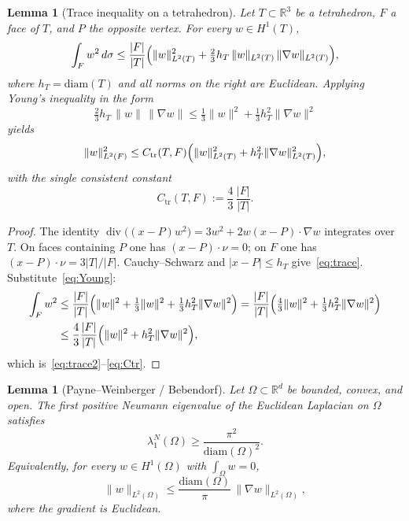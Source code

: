 \documentclass[11pt]{amsart}
\newtheorem{lemma}[theorem]{Lemma}
\theoremstyle{definition}
\newcommand{\RR}{\mathbb{R}}
\newcommand{\diam}{\mathrm{diam}}
\newcommand{\abs}[1]{\lvert#1\rvert}
\newcommand{\norm}[1]{\lVert#1\rVert}
\begin{document}
\begin{lemma}[Trace inequality on a tetrahedron]
\label{lem:T}
Let $T\subset\RR^3$ be a tetrahedron, $F$ a face of $T$, and $P$ the
opposite vertex.  For every $w\in H^1(T)$,
\begin{equation}
\label{eq:trace}
  \int_F w^2\,d\sigma
  \le
  \frac{\abs{F}}{\abs{T}}
  \Bigl(
    \norm{w}_{L^2(T)}^2
    +
    \tfrac23 h_T\,\norm{w}_{L^2(T)}\,\norm{\nabla w}_{L^2(T)}
  \Bigr),
\end{equation}
where $h_T=\diam(T)$ and all norms on the right are Euclidean.  Applying
Young's inequality in the form
\begin{equation}
\label{eq:Young}
  \tfrac23 h_T\,\norm{w}\,\norm{\nabla w}
  \le
  \tfrac13\norm{w}^2
  +
  \tfrac13 h_T^2\norm{\nabla w}^2
\end{equation}
yields
\begin{equation}
\label{eq:trace2}
  \norm{w}_{L^2(F)}^2
  \le
  C_{\mathrm{tr}}(T,F)
  \Bigl(
    \norm{w}_{L^2(T)}^2
    +
    h_T^2\norm{\nabla w}_{L^2(T)}^2
  \Bigr),
\end{equation}
with the single consistent constant
\begin{equation}
\label{eq:Ctr}
  C_{\mathrm{tr}}(T,F)
  :=
  \frac43\,\frac{\abs{F}}{\abs{T}}.
\end{equation}
\end{lemma}

\begin{proof}
The identity
$\operatorname{div}\bigl((x-P)w^2\bigr)=3w^2+2w(x-P)\cdot\nabla w$
integrates over $T$.  On faces containing $P$ one has $(x-P)\cdot\nu=0$;
on $F$ one has $(x-P)\cdot\nu=3\abs{T}/\abs{F}$.  Cauchy--Schwarz and
$\abs{x-P}\le h_T$ give~\eqref{eq:trace}.  Substitute~\eqref{eq:Young}:
\begin{align*}
  \int_F w^2
  &\le
  \frac{\abs{F}}{\abs{T}}
  \Bigl(
    \norm{w}^2
    +
    \tfrac13\norm{w}^2
    +
    \tfrac13 h_T^2\norm{\nabla w}^2
  \Bigr)
  =
  \frac{\abs{F}}{\abs{T}}
  \Bigl(
    \tfrac43\norm{w}^2
    +
    \tfrac13 h_T^2\norm{\nabla w}^2
  \Bigr)\\
  &\le
  \frac43\frac{\abs{F}}{\abs{T}}
  \Bigl(
    \norm{w}^2
    +
    h_T^2\norm{\nabla w}^2
  \Bigr),
\end{align*}
which is~\eqref{eq:trace2}--\eqref{eq:Ctr}.
\end{proof}

\begin{lemma}[Payne--Weinberger / Bebendorf]
\label{lem:PW}
Let $\Omega\subset\RR^d$ be bounded, convex, and open.  The first positive
Neumann eigenvalue of the Euclidean Laplacian on $\Omega$ satisfies
\begin{equation}
\label{eq:PW}
  \lambda_1^N(\Omega)
  \ge
  \frac{\pi^2}{\diam(\Omega)^2}.
\end{equation}
Equivalently, for every $w\in H^1(\Omega)$ with $\int_\Omega w=0$,
\begin{equation}
\label{eq:Poincare}
  \norm{w}_{L^2(\Omega)}
  \le
  \frac{\diam(\Omega)}{\pi}\,
  \norm{\nabla w}_{L^2(\Omega)},
\end{equation}
where the gradient is Euclidean.
\end{lemma}
\end{document}
